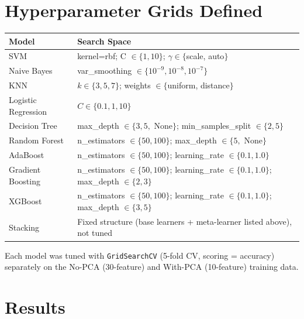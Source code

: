 \documentclass[12pt,a4paper]{article}
\begin{document}
\section{Hyperparameter Grids Defined}

\begin{longtable}{ll}
\toprule
Model & Search Space\\
\midrule
SVM & kernel=rbf; C $\in \{1, 10\}$; $\gamma \in \{$scale, auto$\}$ \\
Naive Bayes & var\_smoothing $\in \{10^{-9}, 10^{-8}, 10^{-7}\}$ \\
KNN & $k \in \{3, 5, 7\}$; weights $\in \{$uniform, distance$\}$ \\
Logistic Regression & $C \in \{0.1, 1, 10\}$ \\
Decision Tree & max\_depth $\in \{3, 5,$ None$\}$; min\_samples\_split $\in \{2, 5\}$ \\
Random Forest & n\_estimators $\in \{50, 100\}$; max\_depth $\in \{5,$ None$\}$ \\
AdaBoost & n\_estimators $\in \{50, 100\}$; learning\_rate $\in \{0.1, 1.0\}$ \\
Gradient Boosting & n\_estimators $\in \{50, 100\}$; learning\_rate $\in \{0.1, 1.0\}$; max\_depth $\in \{2, 3\}$ \\
XGBoost & n\_estimators $\in \{50, 100\}$; learning\_rate $\in \{0.1, 1.0\}$; max\_depth $\in \{3, 5\}$ \\
Stacking & Fixed structure (base learners + meta-learner listed above), not tuned \\
\bottomrule
\end{longtable}

Each model was tuned with \texttt{GridSearchCV} (5-fold CV, scoring = accuracy)
separately on the No-PCA (30-feature) and With-PCA (10-feature) training data.

\section{Results}
\end{document}
